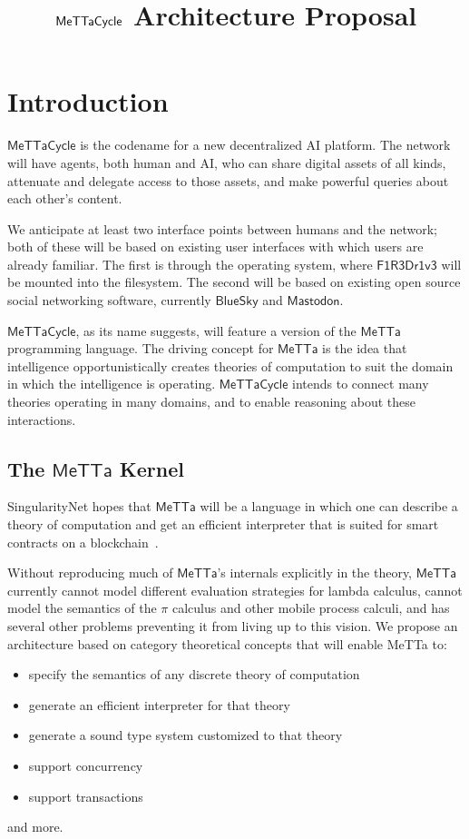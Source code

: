 \documentclass{article}
\title{$\MC$ Architecture Proposal}
\author{}
\date{}
\newcommand{\MC}{\mathsf{MeTTaCycle}}
\newcommand{\FD}{\mathsf{F1R3Dr1v3}}
\begin{document}
\maketitle

\tableofcontents

\section{Introduction}

$\MC$ is the codename for a new decentralized AI platform.  The network will have agents, both human and AI, who can share digital assets of all kinds, attenuate and delegate access to those assets, and make powerful queries about each other's content.  

We anticipate at least two interface points between humans and the network; both of these will be based on existing user interfaces with which users are already familiar.  The first is through the operating system, where $\FD$ will be mounted into the filesystem.  The second will be based on existing open source social networking software, currently $\mathsf{BlueSky}$ and $\mathsf{Mastodon}$.

$\MC$, as its name suggests, will feature a version of the $\mathsf{MeTTa}$ programming language.  The driving concept for $\mathsf{MeTTa}$ is the idea that intelligence opportunistically creates theories of computation to suit the domain in which the intelligence is operating.  $\MC$ intends to connect many theories operating in many domains, and to enable reasoning about these interactions.

\subsection{The $\mathsf{MeTTa}$ Kernel}

SingularityNet hopes that $\mathsf{MeTTa}$ will be a language in which one can describe a theory of computation and get an efficient interpreter that is suited for smart contracts on a blockchain~\cite{GoertzelMeredith2024}.

Without reproducing much of $\mathsf{MeTTa}$'s internals explicitly in the theory, $\mathsf{MeTTa}$ currently cannot model different evaluation strategies for lambda calculus, cannot model the semantics of the $\pi$ calculus and other mobile process calculi, and has several other problems preventing it from living up to this vision.  We propose an architecture based on category theoretical concepts that will enable MeTTa to:
\begin{itemize}
    \item specify the semantics of any discrete theory of computation
    \item generate an efficient interpreter for that theory
    \item generate a sound type system customized to that theory
    \item support concurrency
    \item support transactions
\end{itemize}
and more.
\end{document}
